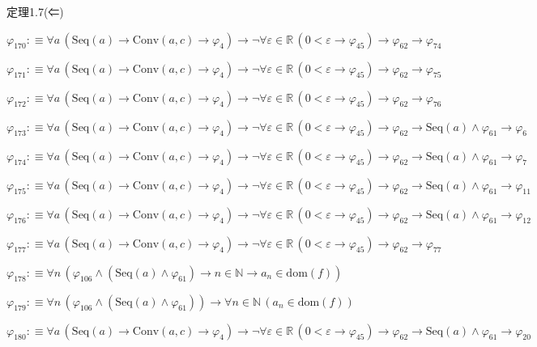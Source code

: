 \begin{fullproof}{定理1.7(⇐)}
\begin{abbrevlist}
\item $\varphi_{170} :\equiv \forall a\,(\mathrm{Seq}(a) \to \mathrm{Conv}(a,c) \to \varphi_{4}) \to \neg \forall \varepsilon \in \mathbb{R}\,(0 < \varepsilon \to \varphi_{45}) \to \varphi_{62} \to \varphi_{74}$
\item $\varphi_{171} :\equiv \forall a\,(\mathrm{Seq}(a) \to \mathrm{Conv}(a,c) \to \varphi_{4}) \to \neg \forall \varepsilon \in \mathbb{R}\,(0 < \varepsilon \to \varphi_{45}) \to \varphi_{62} \to \varphi_{75}$
\item $\varphi_{172} :\equiv \forall a\,(\mathrm{Seq}(a) \to \mathrm{Conv}(a,c) \to \varphi_{4}) \to \neg \forall \varepsilon \in \mathbb{R}\,(0 < \varepsilon \to \varphi_{45}) \to \varphi_{62} \to \varphi_{76}$
\item $\varphi_{173} :\equiv \forall a\,(\mathrm{Seq}(a) \to \mathrm{Conv}(a,c) \to \varphi_{4}) \to \neg \forall \varepsilon \in \mathbb{R}\,(0 < \varepsilon \to \varphi_{45}) \to \varphi_{62} \to \mathrm{Seq}(a) \land \varphi_{61} \to \varphi_{6}$
\item $\varphi_{174} :\equiv \forall a\,(\mathrm{Seq}(a) \to \mathrm{Conv}(a,c) \to \varphi_{4}) \to \neg \forall \varepsilon \in \mathbb{R}\,(0 < \varepsilon \to \varphi_{45}) \to \varphi_{62} \to \mathrm{Seq}(a) \land \varphi_{61} \to \varphi_{7}$
\item $\varphi_{175} :\equiv \forall a\,(\mathrm{Seq}(a) \to \mathrm{Conv}(a,c) \to \varphi_{4}) \to \neg \forall \varepsilon \in \mathbb{R}\,(0 < \varepsilon \to \varphi_{45}) \to \varphi_{62} \to \mathrm{Seq}(a) \land \varphi_{61} \to \varphi_{11}$
\item $\varphi_{176} :\equiv \forall a\,(\mathrm{Seq}(a) \to \mathrm{Conv}(a,c) \to \varphi_{4}) \to \neg \forall \varepsilon \in \mathbb{R}\,(0 < \varepsilon \to \varphi_{45}) \to \varphi_{62} \to \mathrm{Seq}(a) \land \varphi_{61} \to \varphi_{12}$
\item $\varphi_{177} :\equiv \forall a\,(\mathrm{Seq}(a) \to \mathrm{Conv}(a,c) \to \varphi_{4}) \to \neg \forall \varepsilon \in \mathbb{R}\,(0 < \varepsilon \to \varphi_{45}) \to \varphi_{62} \to \varphi_{77}$
\item $\varphi_{178} :\equiv \forall n\,(\varphi_{106} \land (\mathrm{Seq}(a) \land \varphi_{61}) \to n \in \mathbb{N} \to a_{n} \in \mathrm{dom}(f))$
\item $\varphi_{179} :\equiv \forall n\,(\varphi_{106} \land (\mathrm{Seq}(a) \land \varphi_{61})) \to \forall n \in \mathbb{N}\,(a_{n} \in \mathrm{dom}(f))$
\item $\varphi_{180} :\equiv \forall a\,(\mathrm{Seq}(a) \to \mathrm{Conv}(a,c) \to \varphi_{4}) \to \neg \forall \varepsilon \in \mathbb{R}\,(0 < \varepsilon \to \varphi_{45}) \to \varphi_{62} \to \mathrm{Seq}(a) \land \varphi_{61} \to \varphi_{20}$

\end{abbrevlist}
\end{fullproof}
